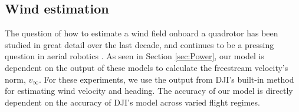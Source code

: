 \subsection{Wind estimation}
The question of how to estimate a wind field onboard a quadrotor has been studied in great detail over the last decade, and continues to be a pressing question in aerial robotics \cite{waslander2009wind, huang2009aerodynamics, gonzalez2019sensing, xiang2016wind}. As seen in Section \ref{sec:Power}, our model is dependent on the output of these models to calculate the freestream velocity's norm, $v_\infty$. For these experiments, we use the output from DJI's built-in method for estimating wind velocity and heading. The accuracy of our model is directly dependent on the accuracy of DJI's model across varied flight regimes. 
